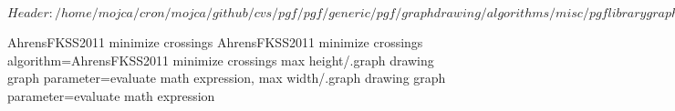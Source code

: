 %
%
%

\ProvidesFileRCS[v\pgfversion] $Header: /home/mojca/cron/mojca/github/cvs/pgf/pgf/generic/pgf/graphdrawing/algorithms/misc/pgflibrarygraphdrawing.misc.code.tex,v 1.1 2011/05/09 12:01:09 tantau Exp $




%
%
%
%

\pgfgddeclarealgorithmkey
{AhrensFKSS2011 minimize crossings}
{AhrensFKSS2011 minimize crossings}
{%
  algorithm=AhrensFKSS2011 minimize crossings
}
{%
  max height/.graph drawing graph parameter=evaluate math expression,
  max width/.graph drawing graph parameter=evaluate math expression
}



\endinput